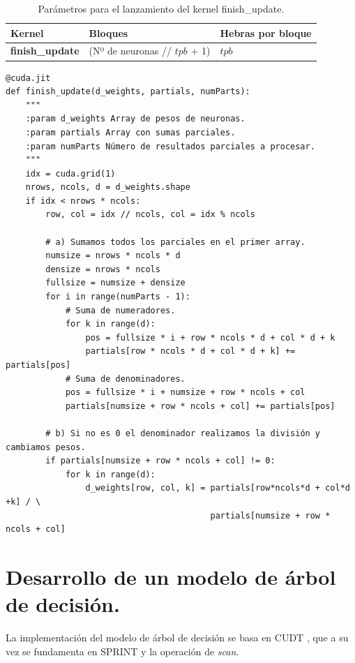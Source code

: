 \begin{table}[ht]
\begin{tabular}{@{}lll@{}}
\toprule
\textbf{Kernel}        & \textbf{Bloques}                                 & \textbf{Hebras por bloque}                                                                       \\ \midrule
\textbf{finish\_update} & (Nº de neuronas // $tpb$ + 1) & $tpb$ \\ \bottomrule
\end{tabular}
\caption{Parámetros para el lanzamiento del kernel finish\_update.}
\label{tab:updatekernel}
\end{table}

\begin{code}
\begin{verbatim}
@cuda.jit
def finish_update(d_weights, partials, numParts):
    """
    :param d_weights Array de pesos de neuronas.
    :param partials Array con sumas parciales.
    :param numParts Número de resultados parciales a procesar.
    """
    idx = cuda.grid(1)
    nrows, ncols, d = d_weights.shape
    if idx < nrows * ncols:
        row, col = idx // ncols, col = idx % ncols
        
        # a) Sumamos todos los parciales en el primer array.
        numsize = nrows * ncols * d
        densize = nrows * ncols
        fullsize = numsize + densize
        for i in range(numParts - 1):
            # Suma de numeradores.
            for k in range(d):
                pos = fullsize * i + row * ncols * d + col * d + k
                partials[row * ncols * d + col * d + k] += partials[pos]
            # Suma de denominadores.
            pos = fullsize * i + numsize + row * ncols + col
            partials[numsize + row * ncols + col] += partials[pos]
    
        # b) Si no es 0 el denominador realizamos la división y cambiamos pesos.
        if partials[numsize + row * ncols + col] != 0:
            for k in range(d):
                d_weights[row, col, k] = partials[row*ncols*d + col*d +k] / \
                                         partials[numsize + row * ncols + col]
\end{verbatim}
\label{code:ending}
\end{code}

\section{Desarrollo de un modelo de árbol de decisión.}
La implementación del modelo de árbol de decisión se basa en CUDT \cite{cudt}, que a su vez se fundamenta en SPRINT \cite{sprint} y la operación de \textit{scan}.

